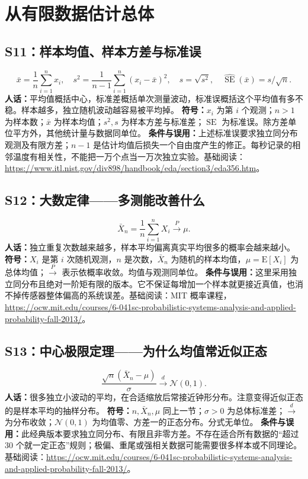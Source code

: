 \documentclass[UTF8,zihao=-4,openany,oneside,fontset=windows]{ctexbook}
\begin{document}
\section{从有限数据估计总体}
\subsection{S11：样本均值、样本方差与标准误}
\begin{equation}
 \bar{x}=\frac1n\sum_{i=1}^{n}x_i,\quad
 s^2=\frac1{n-1}\sum_{i=1}^{n}(x_i-\bar{x})^2,\quad
 s=\sqrt{s^2},\quad\widehat{\operatorname{SE}}(\bar{x})=s/\sqrt n.
\end{equation}
\textbf{人话：}平均值概括中心，标准差概括单次测量波动，标准误概括这个平均值有多不稳。样本越多，独立随机波动越容易被平均掉。
\textbf{符号：}$x_i$ 为第 $i$ 个观测；$n>1$ 为样本数；$\bar{x}$ 为样本均值；$s^2,s$ 为样本方差与标准差；$\operatorname{SE}$ 为标准误。除方差单位平方外，其他统计量与数据同单位。
\textbf{条件与误用：}上述标准误要求独立同分布观测及有限方差；$n-1$ 是估计均值后损失一个自由度产生的修正。每秒记录的相邻温度有相关性，不能把一万个点当一万次独立实验。基础阅读：\url{https://www.itl.nist.gov/div898/handbook/eda/section3/eda356.htm}。

\subsection{S12：大数定律——多测能改善什么}
\begin{equation}
 \bar X_n=\frac1n\sum_{i=1}^{n}X_i\xrightarrow{P}\mu.
\end{equation}
\textbf{人话：}独立重复次数越来越多，样本平均偏离真实平均很多的概率会越来越小。
\textbf{符号：}$X_i$ 是第 $i$ 次随机观测，$n$ 是次数，$\bar X_n$ 为随机的样本均值，$\mu=\mathrm E[X_i]$ 为总体均值；$\xrightarrow{P}$ 表示依概率收敛。均值与观测同单位。
\textbf{条件与误用：}这里采用独立同分布且绝对一阶矩有限的版本。它不保证每增加一个样本就更接近真值，也消不掉传感器整体偏高的系统误差。基础阅读：MIT 概率课程，\url{https://ocw.mit.edu/courses/6-041sc-probabilistic-systems-analysis-and-applied-probability-fall-2013/}。

\subsection{S13：中心极限定理——为什么均值常近似正态}
\begin{equation}
 \frac{\sqrt n(\bar X_n-\mu)}{\sigma}\xrightarrow{d}\mathcal N(0,1).
\end{equation}
\textbf{人话：}很多独立小波动的平均，在合适缩放后常接近钟形分布。注意变得近似正态的是样本平均的抽样分布。
\textbf{符号：}$n,\bar X_n,\mu$ 同上一节；$\sigma>0$ 为总体标准差；$\xrightarrow d$ 为分布收敛；$\mathcal N(0,1)$ 为均值零、方差一的正态分布。分式无单位。
\textbf{条件与误用：}此经典版本要求独立同分布、有限且非零方差。不存在适合所有数据的“超过 30 个就一定正态”规则；极偏、重尾或强相关数据可能需要很多样本或不同理论。基础阅读：\url{https://ocw.mit.edu/courses/6-041sc-probabilistic-systems-analysis-and-applied-probability-fall-2013/}。
\end{document}
